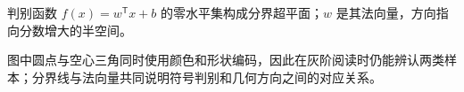 \documentclass[UTF8,a4paper,11pt,openany]{ctexbook}
\begin{document}
\setcounter{page}{217}
\setcounter{chapter}{12}
\setcounter{figure}{0}
\pagestyle{headings}
\begin{geometrybox}
判别函数 $f(x)=w^{\mathsf T}x+b$ 的零水平集构成分界超平面；$w$ 是其法向量，方向指向分数增大的半空间。
\end{geometrybox}

图中圆点与空心三角同时使用颜色和形状编码，因此在灰阶阅读时仍能辨认两类样本；分界线与法向量共同说明符号判别和几何方向之间的对应关系。
\end{document}
